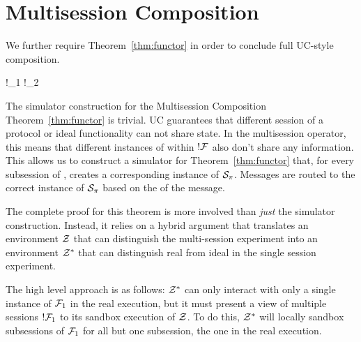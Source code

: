 \section{Multisession Composition} 
We further require Theorem~\ref{thm:functor} in order to conclude full UC-style composition.
\begin{theorem}\label{thm:functor}
	\begin{mathpar}
		{
			!\F_1 \xrightarrow{!\pi} !\F_2
		}
	\end{mathpar}
\end{theorem}
The simulator construction for the Multisession Composition Theorem~\ref{thm:functor} is trivial.
UC guarantees that different session of a protocol or ideal functionality can not share state. 
In the multisession operator, this means that different instances of \F within $!\mathcal{F}$ also don't share any information.
This allows us to construct a simulator for Theorem~\ref{thm:functor} that, for every subsession of \F, creates a corresponding
instance of $\mathcal{S}_\pi$.
Messages are routed to the correct instance of $\mathcal{S}_\pi$ based on the  of the message. 

The complete proof for this theorem is more involved than \emph{just} the simulator construction.
Instead, it relies on a hybrid argument that translates an environment $\mathcal{Z}$ that can distinguish the multi-session experiment into an environment $\mathcal{Z}^*$ that can distinguish real from ideal in the single session experiment.

The high level approach is as follows: $\mathcal{Z}^*$ can only interact with only a single instance of $\mathcal{F}_1$ in the real execution, but it must present a view of multiple sessions $!\mathcal{F}_1$ to its sandbox execution of $\mathcal{Z}$.
To do this, $\mathcal{Z}^*$ will locally sandbox subsessions of $\mathcal{F}_1$ for all but one subsession, the one in the real execution.

